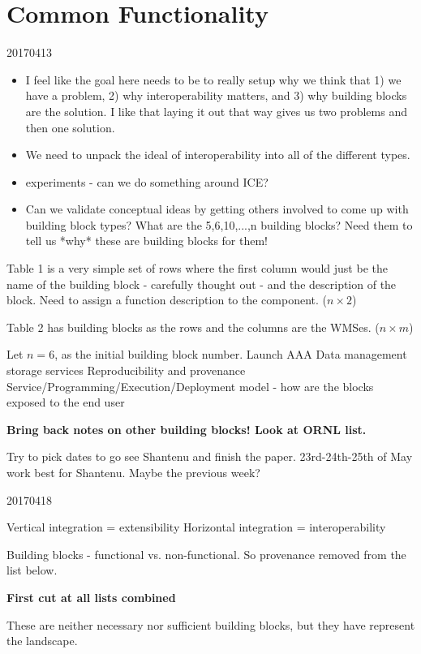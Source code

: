 \section{Common Functionality}\label{commonFunc}

20170413
\begin{itemize}
\item I feel like the goal here needs to be to really setup why we think that 1) we have a problem, 2) why interoperability matters, and 3) why building blocks are the solution. I like that laying it out that way gives us two problems and then one solution.
\item We need to unpack the ideal of interoperability into all of the different types.
\item experiments - can we do something around ICE?
\item Can we validate conceptual ideas by getting others involved to come up with building block types? What are the 5,6,10,...,n building blocks? Need them to tell us *why* these are building blocks for them!
\end{itemize}

Table 1 is a very simple set of rows where the first column would just be the name of the building block - carefully thought out - and the description of the block. Need to assign a function description to the component. ($n \times 2$)

Table 2 has building blocks as the rows and the columns are the WMSes. ($n \times m$)

Let $n = 6$, as the initial building block number.
Launch
AAA
Data management storage services
Reproducibility and provenance
Service/Programming/Execution/Deployment model - how are the blocks exposed to the end user

\textbf{Bring back notes on other building blocks! Look at ORNL list.}

Try to pick dates to go see Shantenu and finish the paper. 23rd-24th-25th of May work best for Shantenu. Maybe the previous week?

20170418

Vertical integration = extensibility
Horizontal integration = interoperability

Building blocks - functional vs. non-functional. So provenance removed from the list below.

{\bf First cut at all lists combined}

These are neither necessary nor sufficient building blocks, but they have represent the landscape.

